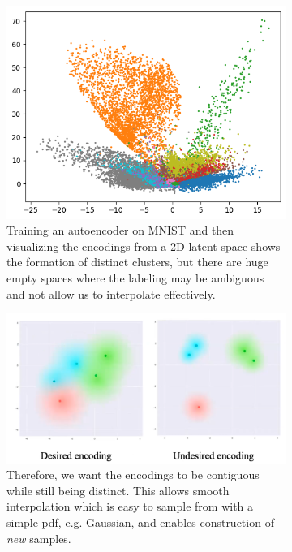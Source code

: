   \begin{figure}[H]
    \centering
    \begin{subfigure}[b]{0.48\textwidth}
      \centering
      \includegraphics[scale=0.36]{img/mnist_latent.png}
      \caption{Training an autoencoder on MNIST and then visualizing the encodings from a 2D latent space shows the formation of distinct clusters, but there are huge empty spaces where the labeling may be ambiguous and not allow us to interpolate effectively. }
      \label{fig:mnist_latent}
    \end{subfigure}
    \hfill 
    \begin{subfigure}[b]{0.48\textwidth}
      \centering
      \includegraphics[scale=0.22]{img/contiguous_encoding.png}
      \caption{ Therefore, we want the encodings to be contiguous while still being distinct. This allows smooth interpolation which is easy to sample from with a simple pdf, e.g. Gaussian, and enables construction of \textit{new} samples. } 
      \label{fig:contiguous_encoding}
    \end{subfigure}
    \caption{}
    \label{fig:motivation_vae}
  \end{figure}

